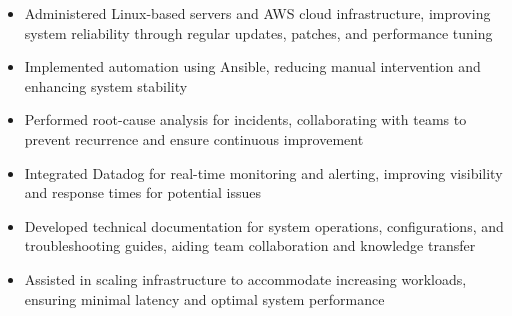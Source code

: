 \par\smallskip
\noindent
\begin{minipage}{20cm}
  \begin{minipage}{9.75cm}
    \begin{itemize}
      \item Administered Linux-based servers and AWS cloud infrastructure, improving system reliability through regular updates, patches, and performance tuning
      \item Implemented automation using Ansible, reducing manual intervention and enhancing system stability
      \item Performed root-cause analysis for incidents, collaborating with teams to prevent recurrence and ensure continuous improvement
    \end{itemize}
  \end{minipage}
  \hfill
  \begin{minipage}{9.75cm}
    \begin{itemize}
      \item Integrated Datadog for real-time monitoring and alerting, improving visibility and response times for potential issues
      \item Developed technical documentation for system operations, configurations, and troubleshooting guides, aiding team collaboration and knowledge transfer
      \item Assisted in scaling infrastructure to accommodate increasing workloads, ensuring minimal latency and optimal system performance
    \end{itemize}
  \end{minipage}
\end{minipage}
\par\smallskip
\divider

